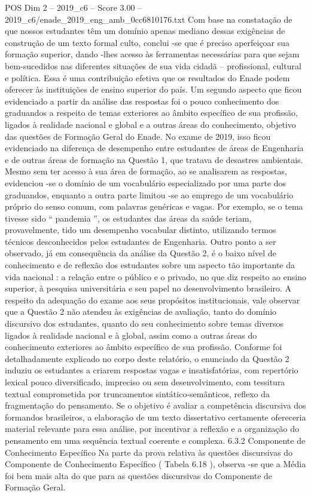 \begin{textsample}{POS Dim 2 – 2019\_c6 – Score 3.00 – 2019\_c6/enade\_2019\_eng\_amb\_0cc6810176.txt}
Com base na constatação de que nossos estudantes têm um domínio apenas mediano dessas exigências de construção de um texto formal culto, conclui -se que é preciso aperfeiçoar sua formação superior, dando -lhes acesso às ferramentas necessárias para que sejam bem-sucedidos nas diferentes situações de sua vida cidadã – profissional, cultural e política.
Essa é uma contribuição efetiva que os resultados do Enade podem oferecer às instituições de ensino superior do país.
Um segundo aspecto que ficou evidenciado a partir da análise das respostas foi o pouco conhecimento dos graduandos a respeito de temas exteriores ao âmbito específico de sua profissão, ligados à realidade nacional e global e a outras áreas do conhecimento, objetivo das questões de Formação Geral do Enade.
No exame de 2019, isso ficou evidenciado na diferença de desempenho entre estudantes de áreas de Engenharia e de outras áreas de formação na Questão 1, que tratava de desastres ambientais.
Mesmo sem ter acesso à sua área de formação, ao se analisarem as respostas, evidenciou -se o domínio de um vocabulário especializado por uma parte dos graduandos, enquanto a outra parte limitou -se ao emprego de um vocabulário próprio do senso comum, com palavras genéricas e vagas.
Por exemplo, se o tema tivesse sido “ pandemia ”, os estudantes das áreas da saúde teriam, provavelmente, tido um desempenho vocabular distinto, utilizando termos técnicos desconhecidos pelos estudantes de Engenharia.
Outro ponto a ser observado, já em consequência da análise da Questão 2, é o baixo nível de conhecimento e de reflexão dos estudantes sobre um aspecto tão importante da vida nacional : a relação entre o público e o privado, no que diz respeito ao ensino superior, à pesquisa universitária e seu papel no desenvolvimento brasileiro.
A respeito da adequação do exame aos seus propósitos institucionais, vale observar que a Questão 2 não atendeu às exigências de avaliação, tanto do domínio discursivo dos estudantes, quanto do seu conhecimento sobre temas diversos ligados à realidade nacional e à global, assim como a outras áreas do conhecimento exteriores ao âmbito específico de sua profissão.
Conforme foi detalhadamente explicado no corpo deste relatório, o enunciado da Questão 2 induziu os estudantes a criarem respostas vagas e insatisfatórias, com repertório lexical pouco diversificado, impreciso ou sem desenvolvimento, com tessitura textual comprometida por truncamentos sintático-semânticos, reflexo da fragmentação do pensamento.
Se o objetivo é avaliar a competência discursiva dos formandos brasileiros, a elaboração de um texto dissertativo certamente ofereceria material relevante para essa análise, por incentivar a reflexão e a organização do pensamento em uma sequência textual coerente e complexa. 6.3.2 Componente de Conhecimento Específico Na parte da prova relativa às questões discursivas do Componente de Conhecimento Específico ( Tabela 6.18 ), observa -se que a Média foi bem mais alta do que para as questões discursivas do Componente de Formação Geral.

\end{textsample}
